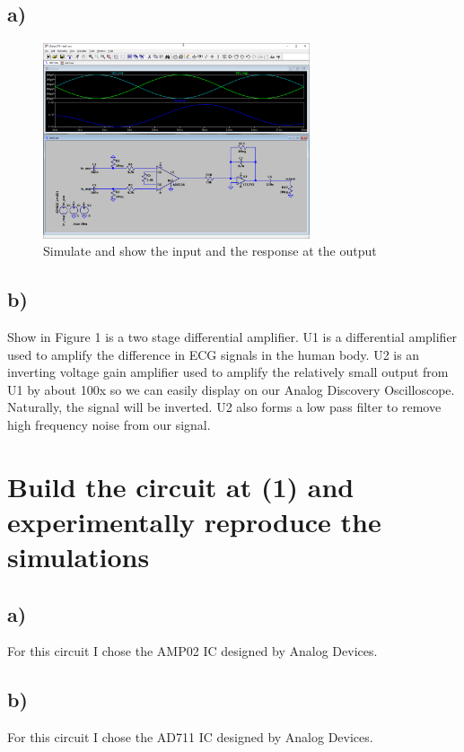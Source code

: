 \documentclass{article}
\begin{document}
		\subsection*{a)}

			\begin{figure}[H]
				\centering
				\includegraphics[width=0.7\textwidth]{sch}
				\caption{Simulate and show the input and the response at the output}
			\end{figure}

		\subsection*{b)}
			Show in Figure 1 is a two stage differential amplifier. U1 is a differential amplifier used to amplify the difference in ECG signals in the human body. U2 is an inverting voltage gain amplifier used to amplify the relatively small output from U1 by about 100x so we can easily display on our Analog Discovery Oscilloscope. Naturally, the signal will be inverted. U2 also forms a low pass filter to remove high frequency noise from our signal.

	\section{Build the circuit at (1) and experimentally reproduce the simulations}

		\subsection*{a)}
			For this circuit I chose the AMP02 IC designed by Analog Devices.

		\subsection*{b)}
			For this circuit I chose the AD711 IC designed by Analog Devices.
\end{document}
